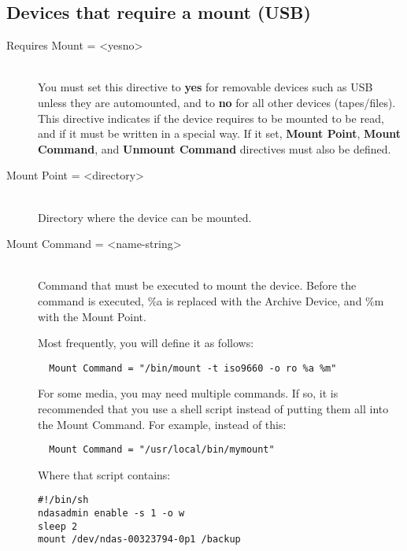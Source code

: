 \subsection{Devices that require a mount (USB)}

\begin{description}
\item [Requires Mount = {\textless}yes{\textbar}no{\textgreater}] \hfill \\
You must set this directive to {\bf yes} for removable devices such as
USB unless they are automounted, and to {\bf no} for all other devices
(tapes/files).  This directive indicates if the device requires to be
mounted to be read, and if it must be written in a special way.  If it
set, {\bf Mount Point}, {\bf Mount Command}, and {\bf Unmount Command}
directives must also be defined.

\item [Mount Point = {\textless}directory{\textgreater}] \hfill \\
Directory where the device can be mounted.

\item [Mount Command = {\textless}name-string{\textgreater}] \hfill \\
Command that must be executed to mount the device. Before the command is
executed, \%a is replaced with the Archive Device, and \%m with the Mount
Point.

Most frequently, you will define it as follows:

\footnotesize
\begin{verbatim}
  Mount Command = "/bin/mount -t iso9660 -o ro %a %m"
\end{verbatim}
\normalsize

For some media, you may need multiple commands.  If so, it is recommended
that you use a shell script instead of putting them all into the Mount
Command.  For example, instead of this:

\footnotesize
\begin{verbatim}
  Mount Command = "/usr/local/bin/mymount"
\end{verbatim}
\normalsize

Where that script contains:

\footnotesize
\begin{verbatim}
#!/bin/sh
ndasadmin enable -s 1 -o w
sleep 2
mount /dev/ndas-00323794-0p1 /backup
\end{verbatim}
\normalsize


\end{description}
